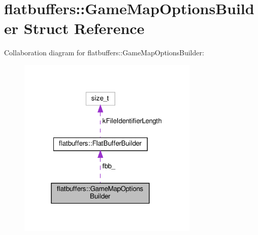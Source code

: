 \hypertarget{structflatbuffers_1_1GameMapOptionsBuilder}{}\section{flatbuffers\+:\+:Game\+Map\+Options\+Builder Struct Reference}
\label{structflatbuffers_1_1GameMapOptionsBuilder}


Collaboration diagram for flatbuffers\+:\+:Game\+Map\+Options\+Builder\+:
\nopagebreak
\begin{figure}[H]
\begin{center}
\leavevmode
\includegraphics[width=244pt]{structflatbuffers_1_1GameMapOptionsBuilder__coll__graph}
\end{center}
\end{figure}
